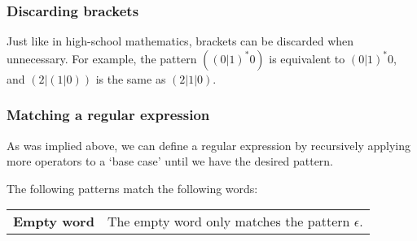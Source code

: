 
\subsubsection{Discarding brackets}

Just like in high-school mathematics, brackets can be discarded when unnecessary. For example, the pattern $((0|1)^*0)$ is equivalent to $(0|1)^*0$, and $(2|(1|0))$ is the same as $(2|1|0)$.

\subsubsection{Matching a regular expression}

As was implied above, we can define a regular expression by recursively
applying more operators to a `base case' until we have the desired pattern.

The following patterns match the following words:

\begin{center}
	\begin{tabular}{>{\bfseries} l l}
		Empty word & The empty word only matches the pattern $\epsilon$.\\
	\end{tabular}
\end{center}